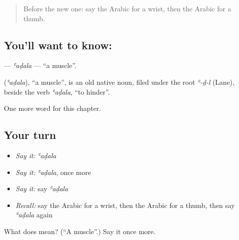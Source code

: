 \begin{quote}
Before the new one: say the Arabic for a wrist, then the Arabic for a thumb.
\end{quote}

\subsection*{You'll want to know: }
\textbf{} — \emph{ʿaḍala} — \textquotedblleft{}a muscle\textquotedblright{}.

\begin{cousinweb}
\textbf{} (\emph{ʿaḍala}), \textquotedblleft{}a muscle\textquotedblright{}, is an old native noun, filed under the root \emph{ʿ-ḍ-l} (Lane), beside the verb \emph{ʿaḍala}, \textquotedblleft{}to hinder\textquotedblright{}.
\end{cousinweb}

\begin{grammarlens}[title={What you've built}]
One more word for this chapter.
\end{grammarlens}

\subsection*{Your turn}
\begin{itemize}
\raggedright
  \item \emph{Say it:} \emph{ʿaḍala}
  \item \emph{Say it:} \emph{ʿaḍala}, once more
  \item \emph{Say it:} say \emph{ʿaḍala}
  \item \emph{Recall:} say the Arabic for a wrist, then the Arabic for a thumb, then say \emph{ʿaḍala} again
\end{itemize}

\begin{tcolorbox}[breakable,colback=teal!4,colframe=teal!35!black,title={Before you move on}]
What does  mean? (\textquotedblleft{}A muscle\textquotedblright{}.) Say it once more.
\end{tcolorbox}
